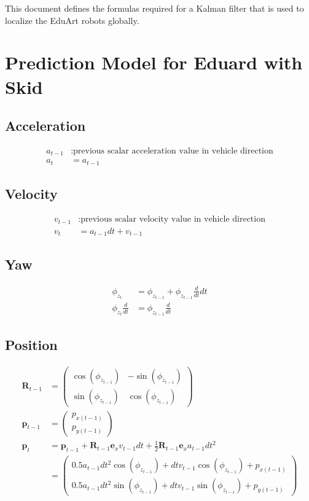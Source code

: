 \documentclass{article}
\begin{document}
This document defines the formulas required for a Kalman filter that is used to localize the EduArt robots globally.

\section{Prediction Model for Eduard with Skid}

\subsection{Acceleration}
\begin{align}
  a_{t-1} &: \textrm{previous scalar acceleration value in vehicle direction} \\
  a_t &= a_{t-1}
\end{align}

\subsection{Velocity}
\begin{align}
  v_{t-1} &: \textrm{previous scalar velocity value in vehicle direction} \\
  v_t &= a_{t-1} dt + v_{t-1}
\end{align}

\subsection{Yaw}
\begin{align}
  \phi_{z_t} &= \phi_{z_{t-1}} + \phi_{z_{t-1}}\frac{d}{dt} dt \\
  \phi_{z_t}\frac{d}{dt} &= \phi_{z_{t-1}}\frac{d}{dt}
\end{align}

\subsection{Position}
\begin{align}
  \textbf{R}_{t-1} &= \left(\begin{matrix}\cos{\left(\phi_{z_{t-1}} \right)} & - \sin{\left(\phi_{z_{t-1}} \right)}\\\sin{\left(\phi_{z_{t-1}} \right)} & \cos{\left(\phi_{z_{t-1}} \right)}\end{matrix}\right) \\
  \textbf{p}_{t-1} &= \left(\begin{matrix}p_{x (t-1)}\\p_{y (t-1)}\end{matrix}\right) \\
  \textbf{p}_t &= \textbf{p}_{t-1} + \textbf{R}_{t-1}\textbf{e}_x v_{t-1}dt + \frac{1}{2}\textbf{R}_{t-1}\textbf{e}_x a_{t-1}dt^2 \\
  &= \left(\begin{matrix}0.5 a_{t-1} dt^{2} \cos{\left(\phi_{z_{t-1}} \right)} + dt v_{t-1} \cos{\left(\phi_{z_{t-1}} \right)} + p_{x (t-1)}\\0.5 a_{t-1} dt^{2} \sin{\left(\phi_{z_{t-1}} \right)} + dt v_{t-1} \sin{\left(\phi_{z_{t-1}} \right)} + p_{y (t-1)}\end{matrix}\right)
\end{align}
\end{document}
